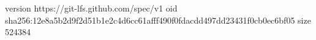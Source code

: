 version https://git-lfs.github.com/spec/v1
oid sha256:12e8a5b2d9f2d51b1e2c4d6cc61afff490f0fdacdd497dd23431f0cb0ec6bf05
size 524384
